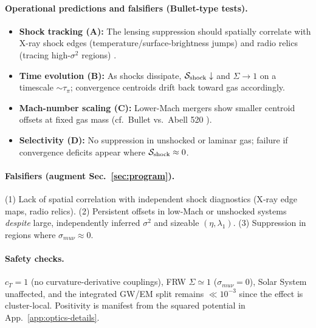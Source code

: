 \documentclass[aps,prd,onecolumn,superscriptaddress,nofootinbib]{revtex4-2}
\def\mu{mu}%
\begin{document}
\paragraph{Operational predictions and falsifiers (Bullet-type tests).}
\begin{itemize}[leftmargin=*,noitemsep,topsep=0pt]
\item \textbf{Shock tracking (A):} The lensing suppression should spatially correlate with X-ray shock edges (temperature/surface-brightness jumps) and radio relics (tracing high-\(\sigma^2\) regions) \cite{Markevitch2002,vanWeeren2019}.
\item \textbf{Time evolution (B):} As shocks dissipate, \(\mathcal S_{\rm shock}\downarrow\) and \(\Sigma\to1\) on a timescale \(\sim\tau_\pi\); convergence centroids drift back toward gas accordingly.
\item \textbf{Mach-number scaling (C):} Lower-Mach mergers show smaller centroid offsets at fixed gas mass (cf.\ Bullet vs.\ Abell 520 \cite{Mahdavi2007}).
\item \textbf{Selectivity (D):} No suppression in unshocked or laminar gas; failure if convergence deficits appear where \(\mathcal S_{\rm shock}\approx 0\).
\end{itemize}

\paragraph{Falsifiers (augment Sec.~\ref{sec:program}).}
(1) Lack of spatial correlation with independent shock diagnostics (X‑ray edge maps, radio relics).
(2) Persistent offsets in low‑Mach or unshocked systems \emph{despite} large, independently inferred \(\sigma^2\) and sizeable \((\eta,\lambda_1)\).
(3) Suppression in regions where \(\sigma_{\mu\nu}\!\approx\!0\).

\paragraph{Safety checks.} \(c_T=1\) (no curvature-derivative couplings), FRW \(\Sigma\simeq1\) (\(\sigma_{\mu\nu}=0\)), Solar System unaffected, and the integrated GW/EM split remains \(\ll 10^{-3}\) since the effect is cluster-local. Positivity is manifest from the squared potential in App.~\ref{app:optics-details}.

\vspace{1ex}
\end{document}
